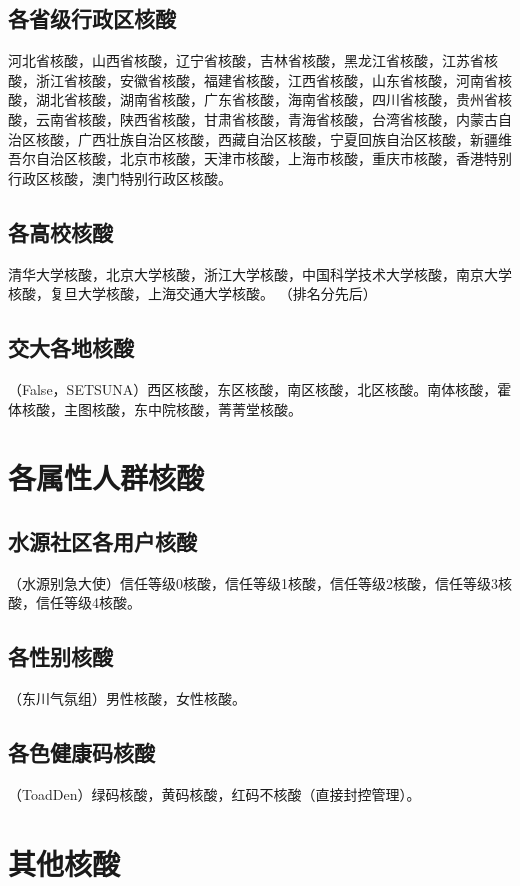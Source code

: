 \documentclass{ctexbook}
\begin{document}
\section{各省级行政区核酸}
河北省核酸，山西省核酸，辽宁省核酸，吉林省核酸，黑龙江省核酸，江苏省核酸，浙江省核酸，安徽省核酸，福建省核酸，江西省核酸，山东省核酸，河南省核酸，湖北省核酸，湖南省核酸，广东省核酸，海南省核酸，四川省核酸，贵州省核酸，云南省核酸，陕西省核酸，甘肃省核酸，青海省核酸，台湾省核酸，内蒙古自治区核酸，广西壮族自治区核酸，西藏自治区核酸，宁夏回族自治区核酸，新疆维吾尔自治区核酸，北京市核酸，天津市核酸，上海市核酸，重庆市核酸，香港特别行政区核酸，澳门特别行政区核酸。

\section{各高校核酸}
清华大学核酸，北京大学核酸，浙江大学核酸，中国科学技术大学核酸，南京大学核酸，复旦大学核酸，上海交通大学核酸。
（排名分先后）

\section{交大各地核酸}
（False，SETSUNA）西区核酸，东区核酸，南区核酸，北区核酸。南体核酸，霍体核酸，主图核酸，东中院核酸，菁菁堂核酸。

\chapter{各属性人群核酸}

\section{水源社区各用户核酸}
（水源别急大使）信任等级0核酸，信任等级1核酸，信任等级2核酸，信任等级3核酸，信任等级4核酸。

\section{各性别核酸}
（东川气氛组）男性核酸，女性核酸。

\section{各色健康码核酸}
（ToadDen）绿码核酸，黄码核酸，红码不核酸（直接封控管理）。

\chapter{其他核酸}
\end{document}
